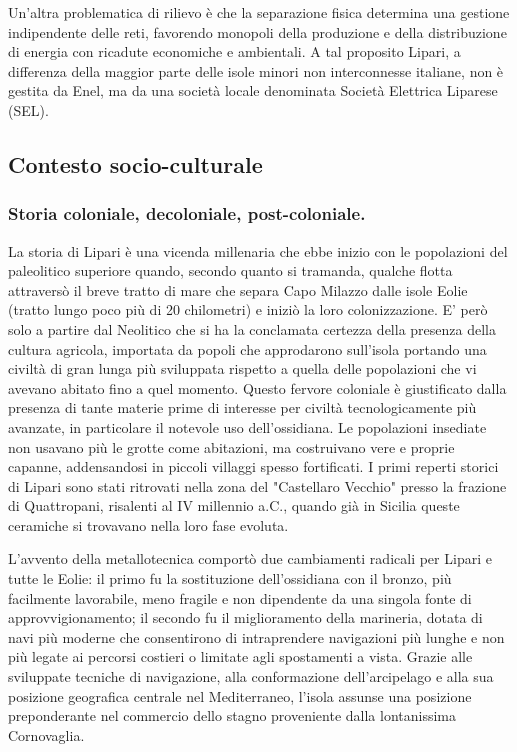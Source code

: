 \documentclass[fleqn,11pt]{SelfArx} %
\begin{document}
Un'altra problematica di rilievo è che la separazione fisica determina una gestione indipendente delle reti, favorendo monopoli della produzione e della distribuzione di energia con ricadute economiche e ambientali. A tal proposito Lipari, a differenza della maggior parte delle isole minori non interconnesse italiane, non è gestita da Enel, ma da una società locale denominata Società Elettrica Liparese (SEL). 


\subsection{Contesto socio-culturale}
\subsubsection{Storia coloniale, decoloniale, post-coloniale.}
La storia di Lipari è una vicenda millenaria che ebbe inizio con le popolazioni del paleolitico superiore quando, secondo quanto si tramanda, qualche flotta attraversò il breve tratto di mare che separa Capo Milazzo dalle isole Eolie (tratto lungo poco più di 20 chilometri) e iniziò la loro colonizzazione. 
E' però solo a partire dal Neolitico che si ha la conclamata certezza della presenza della cultura agricola, importata da popoli che approdarono sull'isola portando una civiltà di gran lunga più sviluppata rispetto a quella delle popolazioni che vi avevano abitato fino a quel momento. Questo fervore coloniale è giustificato dalla presenza di tante materie prime di interesse per civiltà tecnologicamente più avanzate, in particolare il notevole uso dell'ossidiana. Le popolazioni insediate non usavano più le grotte come abitazioni, ma costruivano vere e proprie capanne, addensandosi in piccoli villaggi spesso fortificati. I primi reperti storici di Lipari sono stati ritrovati nella zona del "Castellaro Vecchio" presso la frazione di Quattropani, risalenti al IV millennio a.C., quando già in Sicilia queste ceramiche si trovavano nella loro fase evoluta. 

L'avvento della metallotecnica comportò due cambiamenti radicali per Lipari e tutte le Eolie: il primo fu la sostituzione dell'ossidiana con il bronzo, più facilmente lavorabile, meno fragile e non dipendente da una singola fonte di approvvigionamento; il secondo fu il miglioramento della marineria, dotata di navi più moderne che consentirono di intraprendere navigazioni più lunghe e non più legate ai percorsi costieri o limitate agli spostamenti a vista. Grazie alle sviluppate tecniche di navigazione, alla conformazione dell'arcipelago e alla sua posizione geografica centrale nel Mediterraneo, l'isola assunse una posizione preponderante nel commercio dello stagno proveniente dalla lontanissima Cornovaglia. 
\end{document}
